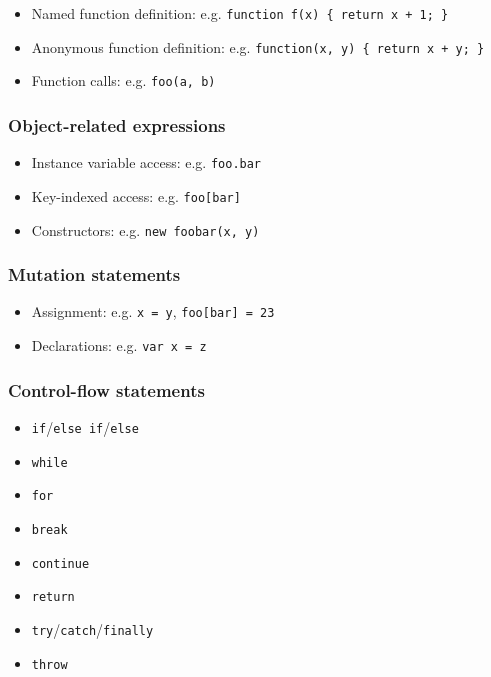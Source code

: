 \documentclass{article}
\begin{document}
\begin{multicols}{2}
\begin{itemize}
  \item Named function definition: e.g. \texttt{function f(x) \{ return x + 1; \} }
  \item Anonymous function definition: e.g. \texttt{function(x, y) \{ return x + y; \} }
  \item Function calls: e.g. \texttt{foo(a, b)}
\end{itemize}

\subsubsection*{Object-related expressions}

\begin{itemize}
  \item Instance variable access: e.g. \texttt{foo.bar}
  \item Key-indexed access: e.g. \texttt{foo[bar]}
  \item Constructors: e.g. \texttt{new foobar(x, y)}
\end{itemize}

\subsubsection*{Mutation statements}

\begin{itemize}
  \item Assignment: e.g. \texttt{x = y}, \texttt{foo[bar] = 23}
  \item Declarations: e.g. \texttt{var x = z}
\end{itemize}

\subsubsection*{Control-flow statements}

\begin{itemize}
  \item \texttt{if}/\texttt{else if}/\texttt{else}
  \item \texttt{while}
  \item \texttt{for}
  \item \texttt{break}
  \item \texttt{continue}
  \item \texttt{return}
  \item \texttt{try}/\texttt{catch}/\texttt{finally}
  \item \texttt{throw}
\end{itemize}


\end{multicols}
\end{document}

